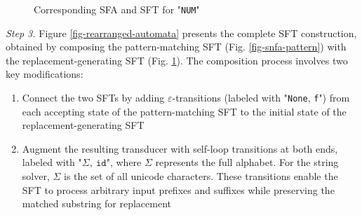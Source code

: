 \begin{figure}[h] \centering
{}
\caption{Corresponding SFA and SFT for "\texttt{NUM}"}
\label{fig-snfa-replacement}
\end{figure}


\noindent\emph{Step 3.}
Figure \ref{fig-rearranged-automata} presents the complete SFT construction, obtained by composing the pattern-matching SFT (Fig. \ref{fig-snfa-pattern}) with the replacement-generating SFT (Fig. \ref{fig-snfa-replacement}). The composition process involves two key modifications:
\begin{enumerate}
  \item Connect the two SFTs by adding $\varepsilon$-transitions (labeled with "\texttt{None}, \texttt{f}") from each accepting state of the pattern-matching SFT to the initial state of the replacement-generating SFT
  \item Augment the resulting transducer with self-loop transitions at both ends, labeled with "$\Sigma,~\texttt{id}$", where $\Sigma$ represents the full alphabet. For the string solver, $\Sigma$ is the set of all unicode characters. These transitions enable the SFT to process arbitrary input prefixes and suffixes while preserving the matched substring for replacement
\end{enumerate}


